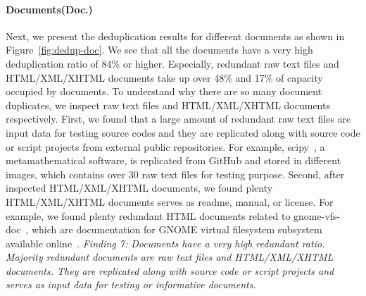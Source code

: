 \paragraph{Documents(Doc.)}
%
Next, we present the deduplication results for different documents as shown in Figure~\ref{fig:dedup-doc}. 
We see that all the documents have a very high deduplication ratio of 84\% or higher.
Especially, redundant raw text files and HTML/XML/XHTML documents take up over 48\% and 17\% of capacity occupied by documents. To understand why there are so many document duplicates, we inspect raw text files and HTML/XML/XHTML documents respectively. First, we found that a large amount of redundant raw text files are input data for testing source codes and 
they are replicated along with source code or script projects from external public repositories. 
For example, scipy~\cite{xxx}, a metamathematical software, is replicated from GitHub and stored in different images, which contains over 30 raw text files for testing purpose.
%
Second, after inspected HTML/XML/XHTML documents, we found plenty HTML/XML/XHTML documents serves as readme, manual, or license. For example, we found plenty redundant HTML documents related to  gnome-vfs-doc~\cite{xxx}, which are documentation for GNOME virtual filesystem subsystem available online~\cite{xxx}.
%
\textit{Finding 7: Documents have a very high redundant ratio. Majority redundant documents are raw text files and HTML/XML/XHTML documents. They are replicated along with source code or script projects and serves as input data for testing or informative documents.}
%
%
%
%

